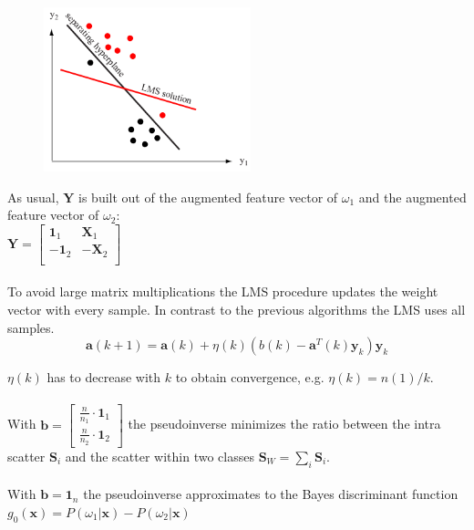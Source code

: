     \begin{figure}
        \includegraphics[width=6cm]{./images/LMS.png}
    \end{figure}
    
     As usual, $\bm Y$ is built out of the augmented feature vector of $\omega_1$ and the augmented feature vector of $\omega_2$:\\
    $\bm Y = \begin{bmatrix}
    \bm 1_1 & \bm X_1 \\
    - \bm 1_2 & -\bm X_2  \\
    \end{bmatrix}$ \\
    
    \\
    To avoid large matrix multiplications the LMS procedure updates the weight vector with every sample. 
    In contrast to the previous algorithms the LMS uses all samples.
    \begin{equation*}
        \bm a(k+1)=\bm a(k)+\eta(k)\left(b(k)-\bm a^T(k)\bm y_k\right)\bm y_k
    \end{equation*}
    
    $\eta(k)$ has to decrease with $k$ to obtain convergence, e.g. $\eta(k)=n(1)/k$.\\

    \\
        With $\bm b=\begin{bmatrix}
        \frac{n}{n_1} \cdot \bm 1_1\\
        \frac{n}{n_2} \cdot \bm 1_2
        \end{bmatrix}$ the pseudoinverse minimizes the ratio between the intra scatter $\bm S_i$ and the
        scatter within two classes $\bm S_W = \sum_i \bm S_i$.\\
        
    \\
    With  $\bm b=\bm 1_n$ the pseudoinverse approximates to the Bayes discriminant function $g_0(\bm x) = P(\omega_1 | \bm x) - P(\omega_2 | \bm x)$\\

